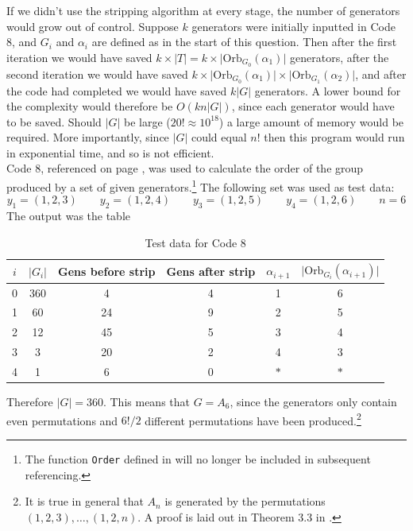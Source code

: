 \documentclass[10pt,a4paper,notitlepage]{article}
\newcommand{\abs}[1]{\lvert#1\rvert}
\newcommand{\Orb}{\text{Orb}}
\begin{document}
If we didn't use the stripping algorithm at every stage, the number of generators would grow out of control. Suppose $k$ generators were initially inputted in Code 8,  and $G_{i}$ and $\alpha_{i}$ are defined as in the start of this question. Then after the first iteration we would have saved $k\times\abs{T}=k\times \abs{\Orb_{G_{0}}(\alpha_{1})}$ generators, after the second iteration we would have saved $k\times \abs{\Orb_{G_{0}}(\alpha_{1})}\times \abs{\Orb_{G_{1}}(\alpha_{2})}$, and after the code had completed we would have saved $k\abs{G}$ generators. A lower bound for the complexity would therefore be $O(kn\abs{G})$, since each generator would have to be saved. Should $\abs{G}$ be large ($20!\approx 10^{18}$) a large amount of memory would be required. More importantly, since $\abs{G}$ could equal $n!$ then this program would run in exponential time, and so is not efficient.\\

Code 8, referenced on page \pageref{cd:8}, was used to calculate the order of the group produced by a set of given generators.\footnote{The function \texttt{Order} defined in  will no longer be included in subsequent referencing.} The following set was used as test data:
\begin{equation*}
y_{1}=(1,2,3) \quad \quad y_{2}=(1,2,4)  \quad \quad y_{3}=(1,2,5)  \quad \quad y_{4}=(1,2,6)  \quad \quad n=6
\end{equation*}
The output was the table
\begin{table}[H]
\centering
\begin{tabular}{c|c|c|c|c|c}
$i$ & $\abs{G_{i}}$ & Gens before strip & Gens after strip & $\alpha_{i+1}$ & $\abs{\Orb_{G_{i}}(\alpha_{i+1})}$\\
\hline 0& 360 & 4 & 4 & 1 & 6\\ 
1& 60 & 24 & 9 & 2 & 5\\ 
2& 12 & 45 & 5 & 3 & 4\\ 
3 & 3 & 20 & 2 & 4 & 3\\
4 & 1 & 6 & 0 & $\ast$ & $\ast$ \\

\end{tabular}
\caption{Test data for Code 8}
\end{table}
Therefore $\abs{G}=360$. This means that $G=A_{6}$, since the generators only contain even permutations and $6!/2$ different permutations have been produced.\footnote{It is true in general that $A_{n}$ is generated by the permutations $(1,2,3),\hdots ,(1,2,n)$. A proof is laid out in Theorem 3.3 in \cite{PermStuff}.}\\
\end{document}

